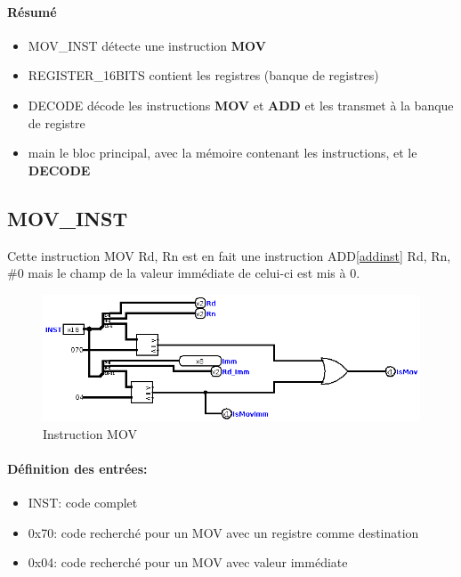 \documentclass[a4paper]{article} %
\begin{document}
\paragraph{Résumé}
\begin{itemize}
    \item     MOV\_INST détecte une instruction \textbf{MOV}
    \item     REGISTER\_16BITS contient les registres (banque de registres)
    \item     DECODE décode les instructions \textbf{MOV} et \textbf{ADD} et les transmet à la banque de registre
    \item     main le bloc principal, avec la mémoire contenant les instructions, et le \textbf{DECODE}
\end{itemize}

\subsection{MOV\_INST}
Cette instruction MOV Rd, Rn est en fait une instruction ADD\ref{addinst} Rd, Rn, \#0 mais le champ de la valeur immédiate de celui-ci est mis à 0.
\begin{figure}[H]
    \centering
    \includegraphics[width=.8\textwidth]{src/MOV_INST.png}
    \caption{Instruction MOV}
    \label{mov_img}
\end{figure}
\paragraph{Définition des entrées:}
\begin{itemize}
    \item     INST: code complet
    \item     0x70: code recherché pour un MOV avec un registre comme destination
    \item     0x04: code recherché pour un MOV avec valeur immédiate
\end{itemize}
\end{document}
